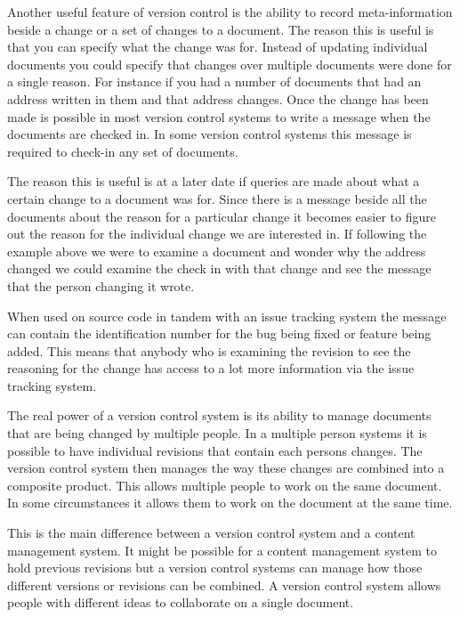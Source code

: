 
Another useful feature of version control is the ability to record meta-information beside a change or a set of changes to a document.  The reason this is useful is that you can specify what the change was for.  Instead of updating individual documents you could specify that changes over multiple documents were done for a single reason.  For instance if you had a number of documents that had an address written in them and that address changes.  Once the change has been made is possible in most version control systems to write a message when the documents are checked in.  In some version control systems this message is required to check-in any set of documents.

The reason this is useful is at a later date if queries are made about what a certain change to a document was for.  Since there is a message beside all the documents about the reason for a particular change it becomes easier to figure out the reason for the individual change we are interested in. If following the example above we were to examine a document and wonder why the address changed we could examine the check in with that change and see the message that the person changing it wrote.

When used on source code in tandem with an issue tracking system the message can contain the identification number for the bug being fixed or feature being added.  This means that anybody who is examining the revision to see the reasoning for the change has access to a lot more information via the issue tracking system.

% 
% 

The real power of a version control system is its ability to manage documents that are being changed by multiple people.  In a multiple person systems it is possible to have individual revisions that contain each persons changes. The version control system then manages the way these changes are combined into a composite product. This allows multiple people to work on the same document. In some circumstances it allows them to work on the document at the same time.

This is the main difference between a version control system and a content management system.  It might be possible for a content management system to hold previous revisions but a version control systems can manage how those different versions or revisions can be combined.  A version control system allows people with different ideas to collaborate on a single document.

